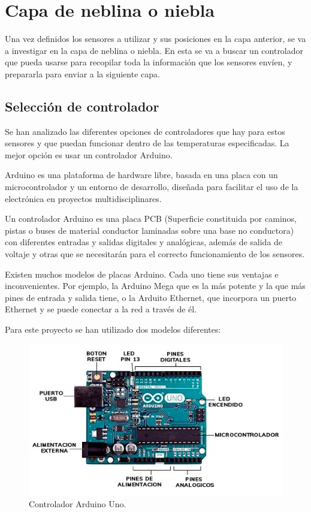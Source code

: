 \chapter{Capa de neblina o niebla}

Una vez definidos los sensores a utilizar y sus posiciones en la capa anterior, se va a investigar en la capa de neblina o niebla. En esta se va a buscar un controlador que pueda usarse para recopilar toda la información que los sensores envíen, y prepararla para enviar a la siguiente capa.

\section{Selección de controlador}

Se han analizado las diferentes opciones de controladores que hay para estos sensores y que puedan funcionar dentro de las temperaturas especificadas. La mejor opción es usar un controlador Arduino.

Arduino es una plataforma de hardware libre, basada en una placa con un microcontrolador y un entorno de desarrollo, diseñada para facilitar el uso de la electrónica en proyectos multidisciplinares.

Un controlador Arduino es una placa PCB (Superficie constituida por caminos, pistas o buses de material conductor laminadas sobre una base no conductora) con diferentes entradas y salidas digitales y analógicas, además de salida de voltaje y otras que se necesitarán para el correcto funcionamiento de los sensores.

Existen muchos modelos de placas Arduino. Cada uno tiene sus ventajas e inconvenientes. Por ejemplo, la Arduino Mega que es la más potente y la que más pines de entrada y salida tiene, o la Arduito Ethernet, que incorpora un puerto Ethernet y se puede conectar a la red a través de él. 



Para este proyecto se han utilizado dos modelos diferentes:

\begin{figure}[h] 
    \centering
    \includegraphics[width=.70\textwidth]{capitulos/capitulo6/uno.jpg}
    \caption{Controlador Arduino Uno.}
    \label{fig:uno}
\end{figure}

